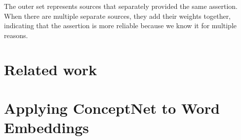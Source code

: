 \documentclass[letterpaper]{article}
\begin{document}
The outer set represents sources that separately provided the same
assertion. When there are multiple separate sources, they add their
weights together, indicating that the assertion is more reliable because
we know it for multiple reasons.





\section{Related work}



\section{Applying ConceptNet to Word Embeddings}
\label{applying-conceptnet-to-word-embeddings}
\end{document}
